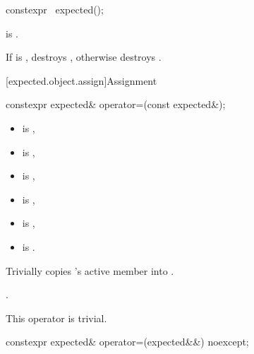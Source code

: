 %
\begin{itemdecl}
constexpr ~expected();
\end{itemdecl}

\begin{itemdescr}
\pnum
\constraints
{} is .

\pnum
\effects
If  is , destroys , otherwise destroys .
\end{itemdescr}

[expected.object.assign]{Assignment}

%
\begin{itemdecl}
constexpr expected& operator=(const expected&);
\end{itemdecl}

\begin{itemdescr}
\pnum
\constraints
\begin{itemize}
\item {} is ,
\item {} is ,
\item {} is ,
\item {} is ,
\item {} is ,
\item {} is .
\end{itemize}

\pnum
\effects
Trivially copies 's active member into .

\pnum
\returns
{}.

\pnum
\remarks
This operator is trivial.
\end{itemdescr}

%
\begin{itemdecl}
constexpr expected& operator=(expected&&) noexcept;
\end{itemdecl}

